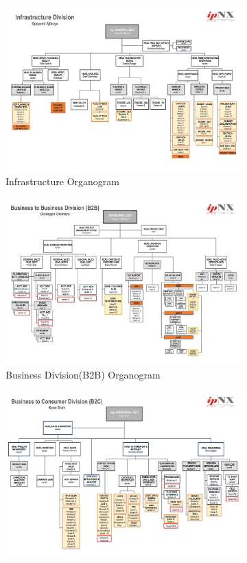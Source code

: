 \begin{figure}[h!]
	\centering
	\begin{subfigure}[b]{0.45\textwidth}
		\centering
		\includegraphics[width=\textwidth]{./InfrastructureOrgan}
		\caption{Infrastructure Organogram}
	\end{subfigure}
	\hfill
	\begin{subfigure}[b]{0.45\textwidth}
		\centering
		\includegraphics[width=\textwidth]{./B2Borg}
		\caption{Business Division(B2B) Organogram}
	\end{subfigure}
	\hfill
	\begin{subfigure}[b]{0.5\textwidth}
		\centering
		\includegraphics[width=\textwidth]{./B2COrgan}

\end{subfigure}
\end{figure}
